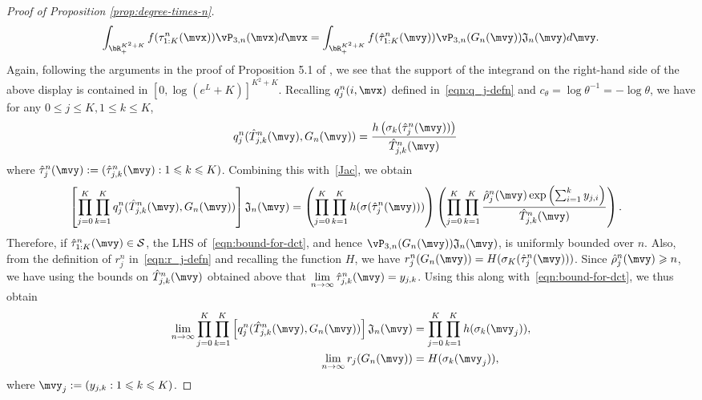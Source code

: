 \documentclass[letterpaper,11pt,reqno]{amsart}
\theoremstyle{definition}
\renewcommand{\le}{\leqslant}
\renewcommand{\leq}{\leqslant}
\renewcommand{\geq}{\geqslant}
\newcommand{\cS}{\mathcal{S}}\newcommand{\cT}{\mathcal{T}}\newcommand{\cU}{\mathcal{U}}
\newcommand{\fJ}{\mathfrak{J}}\newcommand{\fK}{\mathfrak{K}}\newcommand{\fL}{\mathfrak{L}}
\begin{document}
\begin{proof}[Proof of Proposition \ref{prop:degree-times-n}]
\begin{align*}
        \int_{\bR_+^{K^2+K}} f(\tau^n_{1:K}(\mvx)) \vP_{3,n}(\mvx)d\mvx = \int_{\bR_+^{K^2+K}} f(\hat{\tau}^n_{1:K}(\mvy)) \vP_{3,n}(G_n(\mvy)) \fJ_n(\mvy)d\mvy. 
    \end{align*} 
    Again, following the arguments in the proof of Proposition 5.1 of \cite{BBDS04_macro}, we see that the support of the integrand on the right-hand side of the above display is contained in $[0, \log\left(e^L + K\right)]^{K^2+K}$.
Recalling $q^n_j(i,\mvx)$ defined in~\eqref{eqn:q_j-defn} and $c_\theta = \log \theta^{-1}= -\log \theta$, we have for any $0 \le j \le K, 1 \le k \le K$,
\begin{align*}
    q^n_j(\hat{T}^n_{j,k}(\mvy),G_n(\mvy)) 
    &= \frac{h\left(\sigma_k(\hat{\tau}_j^n(\mvy))\right)}{\hat{T}^n_{j,k}(\mvy)}
\end{align*}
where $\hat{\tau}^n_{j}(\mvy) := (\hat{\tau}^n_{j,k}(\mvy): 1\leq k\leq K)$. Combining this with~\eqref{Jac}, we obtain
\begin{align}\label{eqn:bound-for-dct}
\begin{split}
&\left[\prod\limits_{j=0}^K\prod\limits_{k=1}^K q^n_j(\hat{T}^n_{j,k}(\mvy),G_n(\mvy))\right] \fJ_n(\mvy) = \left(\prod_{j=0}^{K}\prod_{k=1}^K h(\sigma(\hat{\tau}^n_{j}(\mvy)))\right) \left(\prod_{j=0}^{K}\prod_{k=1}^K \frac{\hat{\rho}^n_j(\mvy)\exp\left({\sum_{i=1}^{k}y_{j,i}}\right)}{\hat{T}_{j,k}^n(\mvy)}\right).
\end{split}
\end{align} 
Therefore, if  $\hat{\tau}_{1:K}^n(\mvy) \in \cS$, the LHS of~\eqref{eqn:bound-for-dct}, and hence $\vP_{3,n}(G_n(\mvy)) \fJ_n(\mvy)$, is uniformly bounded over $n$. Also, from the definition of $r^n_j$ in~\eqref{eqn:r_j-defn} and recalling the function $H$, we have $
    r^n_j(G_n(\mvy)) = H(\sigma_K(\hat{\tau}_j^n(\mvy)))$. Since $\hat{\rho}^n_j(\mvy) \geq n$, we have using the bounds on $\hat{T}^n_{j,k}(\mvy)$ obtained above that $\lim\limits_{n\to \infty} \hat{\tau}^n_{j,k}(\mvy) = y_{j,k}$. Using this along with~\eqref{eqn:bound-for-dct}, we thus obtain
    \begin{align}
        \lim\limits_{n\to\infty} \prod\limits_{j=0}^K \prod\limits_{k=1}^K \left[q^n_j(\hat{T}^n_{j,k}(\mvy), G_n(\mvy))\right] \fJ_n(\mvy) &= \prod_{j=0}^{K}\prod_{k=1}^K h(\sigma_k(\mvy_j))\label{eqn:pointwise-limit-1},\\
        \lim\limits_{n\to \infty}r_j(G_n(\mvy)) &= H(\sigma_k(\mvy_j))\label{eqn:pointwise-limit-2},
    \end{align} where $\mvy_j := (y_{j,k} : 1 \le k \le K)$.
    

\end{proof}
\end{document}
